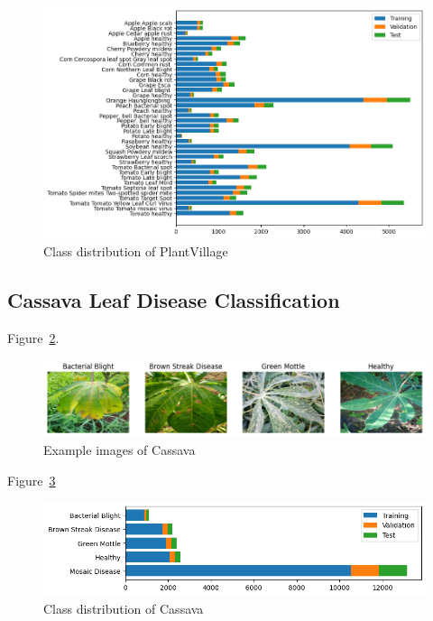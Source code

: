 \begin{figure}[H]
    \begin{center}
    \includegraphics[width=15cm]{../images/class_distribution_of_plantvillage.png}
    \caption{Class distribution of PlantVillage}
   \label{fig:class_distribution_of_plantvillage}
    \end{center}
\end{figure}

\subsection{Cassava Leaf Disease Classification}
Figure~\ref{fig:example_images_of_cassava}.

\begin{figure}[H]
    \begin{center}
    \includegraphics[width=15cm]{../images/example_images_of_cassava.png}
    \caption{Example images of Cassava}
   \label{fig:example_images_of_cassava}
    \end{center}
\end{figure}

Figure~\ref{fig:class_distribution_of_cassava}

\begin{figure}[H]
    \begin{center}
    \includegraphics[width=15cm]{../images/class_distribution_of_cassava.png}
    \caption{Class distribution of Cassava}
   \label{fig:class_distribution_of_cassava}
    \end{center}
\end{figure}


